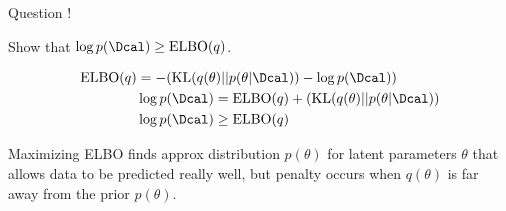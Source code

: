 \documentclass[aspectratio=169,xcolor=dvipsnames,svgnames,x11names,fleqn]{beamer}
\begin{document}
\begin{frame}{Question !}

Show that $\log p(\Dcal) \geq \text{ELBO}(q)$.

\pause 

\begin{tcolorbox}[
    enhanced,
    breakable,                          %
    frame hidden,                       %
    interior hidden,                    %
    borderline west={2pt}{0pt}{black},  %
    borderline west={0.75pt}{3pt}{black!30}, %
    sharp corners,
    boxrule=0pt,
    left=10pt,                          %
    right=0pt,
    top=0pt,
    bottom=0pt,
    coltitle=black,
    fonttitle=\bfseries\sffamily\small,
    attach title to upper,              %
    title={PROOF.\quad},                %
    after title={\textit{---}\medskip}, %
    after upper={\hfill\scalebox{0.8}{$\square$}} %
]

\begin{align*}
\text{ELBO}(q) & = -( \text{KL}(q(\theta)  || p(\theta|\Dcal))  - \log p(\Dcal) ) \\
& \log p(\Dcal) = \text{ELBO}(q)  + ( \text{KL}(q(\theta)  || p(\theta|\Dcal))\\
& \log p(\Dcal) \geq \text{ELBO}(q)
\end{align*}
\end{tcolorbox}

{\color{mainblue}
Maximizing ELBO finds approx distribution $p(\theta)$ for latent parameters $\theta$ that allows data to be predicted really well, but penalty occurs when $q(\theta)$ is far away from the prior $p(\theta)$.
}

\end{frame}
\end{document}
